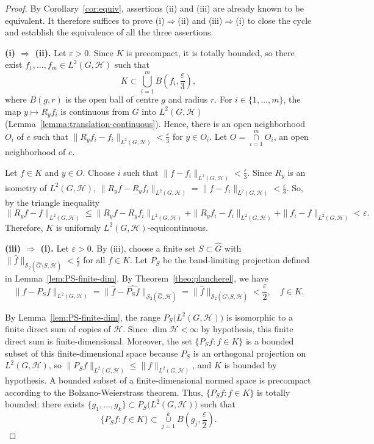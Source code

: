 \documentclass[11pt]{amsart}
\def\union{\mathop{\cup }}
\def\inter{\mathop{\cap }}
\begin{document}
 
\begin{proof}
By Corollary~\ref{cor:equiv}, assertions (ii) and (iii) are already known to be equivalent. It therefore suffices to prove
(i)$\Rightarrow$(ii) and (iii)$\Rightarrow$(i) to close the cycle and establish the equivalence of all the three assertions.

\medskip
\noindent\textbf{(i) $\Rightarrow$ (ii).}
Let $\varepsilon>0$. Since $K$ is precompact, it is totally bounded, so there exist
$f_1,\dots,f_m\in L^2(G,\mathcal{H})$ such that
$$
K\subset\bigcup_{i=1}^m B\left(f_i,\frac{\varepsilon}{3}\right),
$$
where $B\left(g,r\right)$ is the open ball of centre $g$ and radius $r$.
For $i\in\{1,\dots,m\}$, the map $y\mapsto R_yf_i$ is continuous from $G$ into
$L^2(G,\mathcal{H})$ (Lemma~\ref{lemma:translation-continuous}). Hence,  there is an open neighborhood $O_i$ of $e$ such that
$\|R_yf_i-f_i\|_{L^2(G,\mathcal{H})}<\frac{\varepsilon}{3}$ 
for $y\in O_i$. Let $O= \inter\limits_{i=1}^mO_i$,
an open neighborhood of $e$.

Let $f\in K$ and $y\in O$. Choose $i$ such that $\|f-f_i\|_{L^2(G,\mathcal{H})}<\frac{\varepsilon}{3}$.
Since $R_y$ is an isometry of $L^2(G,\mathcal{H})$,
$\|R_yf-R_yf_i\|_{L^2(G,\mathcal{H})}=\|f-f_i\|_{L^2(G,\mathcal{H})}<\frac{\varepsilon}{3}$. So, by the triangle
inequality
$$
\|R_yf-f\|_{L^2(G,\mathcal{H})}\le\|R_yf-R_yf_i\|_{L^2(G,\mathcal{H})}+\|R_yf_i-f_i\|_{L^2(G,\mathcal{H})}+
\|f_i-f\|_{L^2(G,\mathcal{H})}<\varepsilon.
$$
Therefore,
$K$ is uniformly $L^2(G,\mathcal{H})$-equicontinuous.

\medskip
\noindent\textbf{(iii) $\Rightarrow$ (i).}
Let $\varepsilon>0$. By (iii), choose a finite set $S\subset\widehat{G}$ with
$\|\widehat f\|_{\mathscr{S}_2(\widehat{G}\setminus S,\mathcal{H})}<\frac{\varepsilon}{2}$ for all $f\in K$. Let
$P_S$ be the band-limiting projection defined in  Lemma~\ref{lem:PS-finite-dim}.  By Theorem~\ref{theo:plancherel}, we have
$$
\|f-P_Sf\|_{L^2(G,\mathcal{H})}=\|\widehat f-\widehat{P_Sf}\|_{\mathscr{S}_2(\widehat{G},\mathcal{H})}=
\|\widehat f\|_{\mathscr{S}_2(\widehat{G}\setminus S,\mathcal{H})}<\frac{\varepsilon}{2},\quad f\in K.
$$

\noindent By Lemma~\ref{lem:PS-finite-dim}, the
range $P_S\big(L^2(G,\mathcal{H})\big)$ is isomorphic to a finite direct sum of copies of $\mathcal{H}$.  Since $\dim\mathcal{H}<\infty$ by hypothesis, this finite direct sum is finite-dimensional. Moreover, the set $\{P_Sf:f\in K\}$ is a bounded subset of this finite-dimensional space because $P_S$
is an orthogonal projection on $L^2(G,\mathcal{H})$, so $\|P_Sf\|_{L^2(G,\mathcal{H})}\le
\|f\|_{L^2(G,\mathcal{H})}$, and $K$ is bounded by hypothesis. A bounded subset of a
finite-dimensional normed space is precompact according to the Bolzano-Weierstrass theorem.  Thus, 
$\{P_Sf:f\in K\}$ is totally bounded: there exists $\{g_1,\dots,g_k\}\subset
P_S\big(L^2(G,\mathcal{H})\big)$ such that 
$$\{P_Sf:f\in K\}\subset \union\limits_{j=1}^k B\left(g_j,\frac{\varepsilon}{2}\right).$$



\end{proof}
\end{document}
